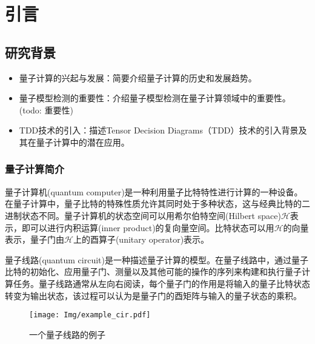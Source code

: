 
\chapter{引言}

\section{研究背景}
\begin{itemize}
  \item 量子计算的兴起与发展：简要介绍量子计算的历史和发展趋势。
  \item 量子模型检测的重要性：介绍量子模型检测在量子计算领域中的重要性。(todo: 重要性)
  \item TDD技术的引入：描述Tensor Decision Diagrams（TDD）技术的引入背景及其在量子计算中的潜在应用。
\end{itemize}

\subsection{量子计算简介}
量子计算机(quantum computer)是一种利用量子比特特性进行计算的一种设备。在量子计算中，量子比特的特殊性质允许其同时处于多种状态，这与经典比特的二进制状态不同。量子计算机的状态空间可以用希尔伯特空间(Hilbert space)\(\mathcal{H}\)表示\citep{nielsen2010quantum}，即可以进行内积运算(inner product)的复向量空间。比特状态可以用\(\mathcal{H}\)的向量表示，量子门由\(\mathcal{H}\)上的酉算子(unitary operator)表示。

量子线路(quantum circuit)是一种描述量子计算的模型。在量子线路中，通过量子比特的初始化、应用量子门、测量以及其他可能的操作的序列来构建和执行量子计算任务。量子线路通常从左向右阅读，每个量子门的作用是将输入的量子比特状态转变为输出状态，该过程可以认为是量子门的酉矩阵与输入的量子状态的乘积。
\begin{figure}[!htbp]
    \centering
    \texttt{[image: Img/example\_cir.pdf]}
    \caption{一个量子线路的例子}
    \label{fig:example_cir}
\end{figure}

